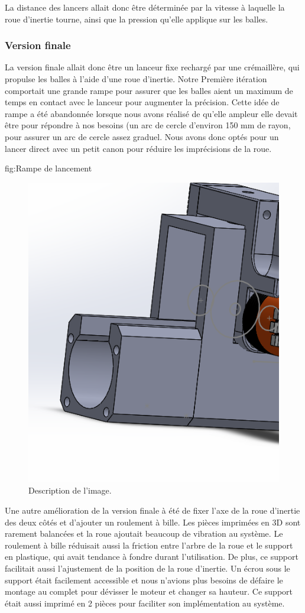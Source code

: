 La distance des lancers allait donc être déterminée par la vitesse à laquelle la roue d’inertie tourne, ainsi que la pression qu’elle applique sur les balles.

\subsubsection{Version finale}
La version finale allait donc être un lanceur fixe rechargé par une crémaillère, qui propulse les balles à l’aide d’une roue d’inertie.
Notre Première itération comportait une grande rampe pour assurer que les balles aient un maximum de temps en contact avec le lanceur pour augmenter la précision.
Cette idée de rampe a été abandonnée lorsque nous avons réalisé de qu’elle ampleur elle devait être pour répondre à nos besoins (un arc de cercle d’environ 150 mm de rayon, pour assurer un arc de cercle assez graduel.
Nous avons donc optés pour un lancer direct avec un petit canon pour réduire les imprécisions de la roue.

fig:Rampe de lancement
\begin{figure}[h!]
    \centering
    \includegraphics[width=0.5\linewidth]{img/s2/cad/cannon}
    \caption{Description de l'image.}
    \label{fig:s2-cad-cannon}
\end{figure}

Une autre amélioration de la version finale à été de fixer l’axe de la roue d’inertie des deux côtés et d’ajouter un roulement à bille.
Les pièces imprimées en 3D sont rarement balancées et la roue ajoutait beaucoup de vibration au système.
Le roulement à bille réduisait aussi la friction entre l’arbre de la roue et le support en plastique, qui avait tendance à fondre durant l’utilisation.
De plus, ce support facilitait aussi l’ajustement de la position de la roue d’inertie.
Un écrou sous le support était facilement accessible et nous n’avions plus besoins de défaire le montage au complet pour dévisser le moteur et changer sa hauteur.
Ce support était aussi imprimé en 2 pièces pour faciliter son implémentation au système.

